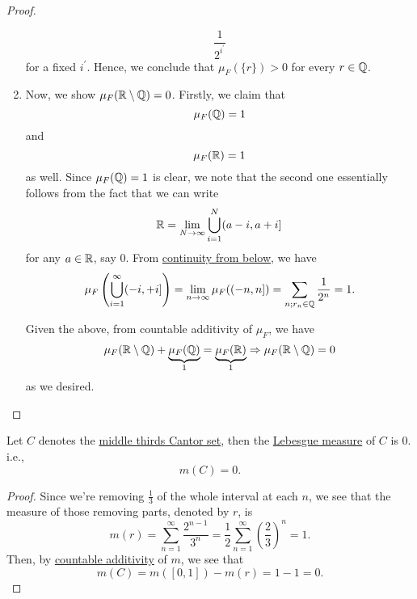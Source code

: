 \begin{proof}
\begin{enumerate}[(1)]
		      \[
			      \frac{1}{2^{i ^\prime }}
		      \]
		      for a fixed \(i ^\prime \). Hence, we conclude that \(\mu _{F}(\{r\}) > 0\) for every \(r\in\mathbb{\MakeUppercase{q}} \).
		\item Now, we show \(\mu _{F}(\mathbb{\MakeUppercase{r}} \setminus \mathbb{\MakeUppercase{q}} ) = 0\). Firstly, we claim that
		      \[
			      \mu _{F}(\mathbb{\MakeUppercase{q}} ) = 1
		      \]
		      and
		      \[
			      \mu _{F}(\mathbb{\MakeUppercase{r}} ) = 1
		      \]
		      as well. Since \(\mu _{F}(\mathbb{\MakeUppercase{q}} ) = 1\) is clear, we note that the second one essentially follows from the fact that we can write
		      \[
			      \mathbb{\MakeUppercase{r}} = \lim\limits_{N \to \infty} \bigcup\limits_{i=1}^{N} (a-i, a+i]
		      \]
		      for any \(a\in\mathbb{\MakeUppercase{r}} \), say \(0\). From \hyperref[thm:measure-space-continuity-from-below]{continuity from below}, we have
		      \[
			      \mu _{F}\left(\bigcup\limits_{i=1}^{\infty} (-i, +i]\right) = \lim\limits_{n \to \infty} \mu _{F}((-n, n]) = \sum\limits_{n;r_{n}\in\mathbb{\MakeUppercase{q}} }\frac{1}{2^n} = 1.
		      \]

		      \par Given the above, from countable additivity of \(\mu _{F}\), we have
		      \[
			      \mu _{F}(\mathbb{\MakeUppercase{r}} \setminus \mathbb{\MakeUppercase{q}} ) + \underbrace{\mu _{F}(\mathbb{\MakeUppercase{q}} )}_{1} = \underbrace{\mu _{F}(\mathbb{\MakeUppercase{r}} )}_{1} \implies \mu _{F}(\mathbb{\MakeUppercase{r}} \setminus \mathbb{\MakeUppercase{q}} ) = 0
		      \]
		      as we desired.
	\end{enumerate}
\end{proof}

\begin{lemma}\label{lma:Cantor-set-has-measure-0}
	Let \(C\) denotes the \hyperref[eg:lec8:Cantor-set]{middle thirds Cantor set}, then the \hyperref[def:Lebesgue-measure]{Lebesgue measure} of \(C\) is \(0\). i.e.,
	\[
		m(C) = 0.
	\]
\end{lemma}
\begin{proof}
	Since we're removing \(\frac{1}{3}\) of the whole interval at each \(n\), we see that the measure of those removing parts, denoted by \(r\), is
	\[
		m(r) = \sum\limits_{n=1}^{\infty} \frac{2^{n-1}}{3^n} = \frac{1}{2}\sum\limits_{n=1}^{\infty} \left(\frac{2}{3}\right)^n = 1.
	\]
	Then, by \hyperref[def:measure]{countable additivity} of \(m\), we see that
	\[
		m(C) = m([0, 1]) - m(r) = 1 - 1 = 0.
	\]
\end{proof}

